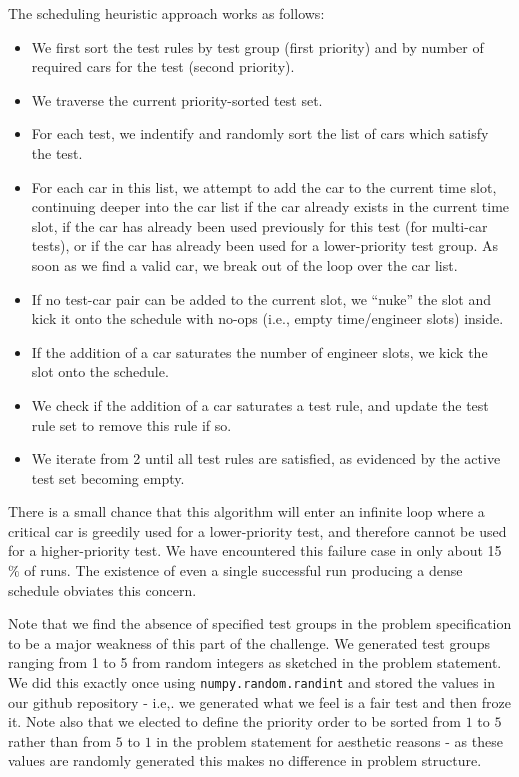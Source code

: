 \documentclass[aps,prl,twocolumn,superscriptaddress,groupedaddress]{revtex4}  %
\begin{document}
The scheduling heuristic approach works as follows:
\begin{itemize}
\item We first sort the test rules by test group (first priority) and by
number of required cars for the test (second priority).
\item We traverse the current priority-sorted test set.
\item For each test, we indentify and randomly sort the list of cars which
satisfy the test.
\item For each car in this list, we attempt to add the car to the current time
slot, continuing deeper into the car list if the car already exists in the
current time slot, if the car has already been used previously for this test
(for multi-car tests), or if the car has already been used for a lower-priority
test group. As soon as we find a valid car, we break out of the loop over the
car list.
\item If no test-car pair can be added to the current slot, we ``nuke'' the slot
and kick it onto the schedule with no-ops (i.e., empty time/engineer slots) inside. 
\item If the addition of a car saturates the number of engineer slots, we kick
the slot onto the schedule.
\item We check if the addition of a car saturates a test rule, and update the
test rule set to remove this rule if so.
\item We iterate from 2 until all test rules are satisfied, as evidenced by the
active test set becoming empty.
\end{itemize}

There is a small chance that this algorithm will enter an infinite loop where a
critical car is greedily used for a lower-priority test, and therefore cannot be
used for a higher-priority test. We have encountered this failure case in only
about 15$\%$ of runs. The existence of even a single successful run producing a
dense schedule obviates this concern. 

Note that we find the absence of specified test groups in the problem
specification to be a major weakness of this part of the challenge. We generated
test groups ranging from 1 to 5 from random integers as sketched in the problem
statement. We did this exactly once using \texttt{numpy.random.randint} and
stored the values in our github repository - i.e,. we generated what we feel is
a fair test and then froze it. Note also that we elected to define the priority
order to be sorted from $1$ to $5$ rather than from $5$ to $1$ in the problem
statement for aesthetic reasons - as these values are randomly generated this
makes no difference in problem structure.
\end{document}
